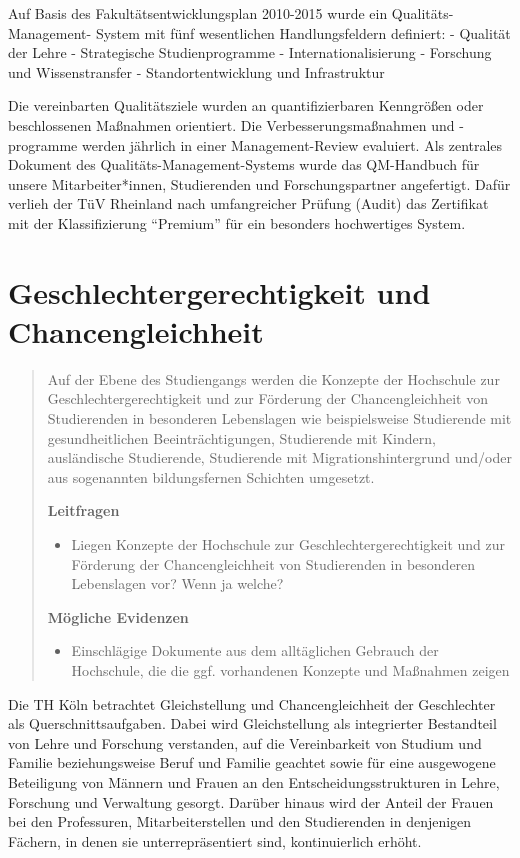 Auf Basis des Fakultätsentwicklungsplan 2010-2015 wurde ein
Qualitäts-Management- System mit fünf wesentlichen Handlungsfeldern
definiert: - Qualität der Lehre - Strategische Studienprogramme -
Internationalisierung - Forschung und Wissenstransfer -
Standortentwicklung und Infrastruktur

Die vereinbarten Qualitätsziele wurden an quantifizierbaren Kenngrößen
oder beschlossenen Maßnahmen orientiert. Die Verbesserungsmaßnahmen und
-programme werden jährlich in einer Management-Review evaluiert. Als
zentrales Dokument des Qualitäts-Management-Systems wurde das
QM-Handbuch für unsere Mitarbeiter*innen, Studierenden und
Forschungspartner angefertigt. Dafür verlieh der TüV Rheinland nach
umfangreicher Prüfung (Audit) das Zertifikat mit der Klassifizierung
``Premium'' für ein besonders hochwertiges System.

\chapter{Geschlechtergerechtigkeit und
Chancengleichheit}\label{geschlechtergerechtigkeit-und-chancengleichheit}

\begin{quote}
Auf der Ebene des Studiengangs werden die Konzepte der Hochschule zur
Geschlechtergerechtigkeit und zur Förderung der Chancengleichheit von
Studierenden in besonderen Lebenslagen wie beispielsweise Studierende
mit gesundheitlichen Beeinträchtigungen, Studierende mit Kindern,
ausländische Studierende, Studierende mit Migrationshintergrund und/oder
aus sogenannten bildungsfernen Schichten umgesetzt.

\textbf{Leitfragen}

\begin{itemize}
\tightlist
\item
  Liegen Konzepte der Hochschule zur Geschlechtergerechtigkeit und zur
  Förderung der Chancengleichheit von Studierenden in besonderen
  Lebenslagen vor? Wenn ja welche?
\end{itemize}

\textbf{Mögliche Evidenzen}

\begin{itemize}
\tightlist
\item
  Einschlägige Dokumente aus dem alltäglichen Gebrauch der Hochschule,
  die die ggf. vorhandenen Konzepte und Maßnahmen zeigen
\end{itemize}
\end{quote}

Die TH Köln betrachtet Gleichstellung und Chancengleichheit der
Geschlechter als Querschnittsaufgaben. Dabei wird Gleichstellung als
integrierter Bestandteil von Lehre und Forschung verstanden, auf die
Vereinbarkeit von Studium und Familie beziehungsweise Beruf und Familie
geachtet sowie für eine ausgewogene Beteiligung von Männern und Frauen
an den Entscheidungsstrukturen in Lehre, Forschung und Verwaltung
gesorgt. Darüber hinaus wird der Anteil der Frauen bei den Professuren,
Mitarbeiterstellen und den Studierenden in denjenigen Fächern, in denen
sie unterrepräsentiert sind, kontinuierlich erhöht.


